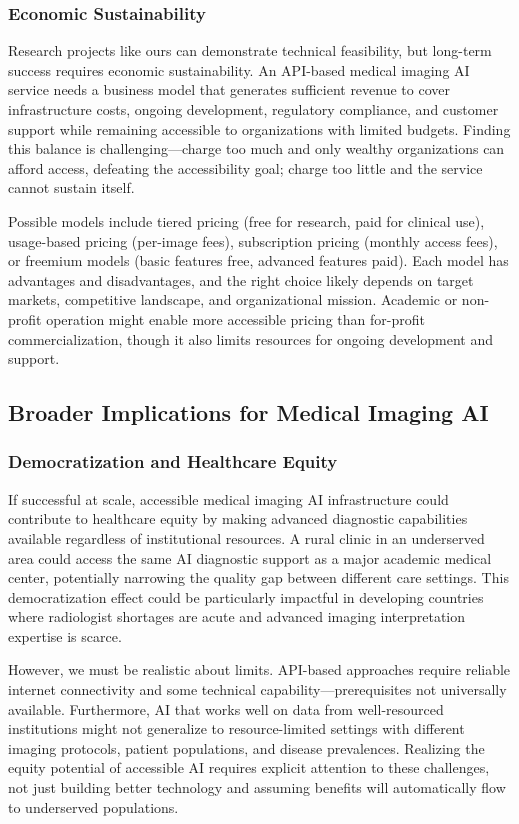 \documentclass[12pt,a4paper]{article}
\begin{document}
\subsubsection{Economic Sustainability}

Research projects like ours can demonstrate technical feasibility, but long-term success requires economic sustainability. An API-based medical imaging AI service needs a business model that generates sufficient revenue to cover infrastructure costs, ongoing development, regulatory compliance, and customer support while remaining accessible to organizations with limited budgets. Finding this balance is challenging—charge too much and only wealthy organizations can afford access, defeating the accessibility goal; charge too little and the service cannot sustain itself.

Possible models include tiered pricing (free for research, paid for clinical use), usage-based pricing (per-image fees), subscription pricing (monthly access fees), or freemium models (basic features free, advanced features paid). Each model has advantages and disadvantages, and the right choice likely depends on target markets, competitive landscape, and organizational mission. Academic or non-profit operation might enable more accessible pricing than for-profit commercialization, though it also limits resources for ongoing development and support.

\subsection{Broader Implications for Medical Imaging AI}

\subsubsection{Democratization and Healthcare Equity}

If successful at scale, accessible medical imaging AI infrastructure could contribute to healthcare equity by making advanced diagnostic capabilities available regardless of institutional resources. A rural clinic in an underserved area could access the same AI diagnostic support as a major academic medical center, potentially narrowing the quality gap between different care settings. This democratization effect could be particularly impactful in developing countries where radiologist shortages are acute and advanced imaging interpretation expertise is scarce.

However, we must be realistic about limits. API-based approaches require reliable internet connectivity and some technical capability—prerequisites not universally available. Furthermore, AI that works well on data from well-resourced institutions might not generalize to resource-limited settings with different imaging protocols, patient populations, and disease prevalences. Realizing the equity potential of accessible AI requires explicit attention to these challenges, not just building better technology and assuming benefits will automatically flow to underserved populations.
\end{document}
